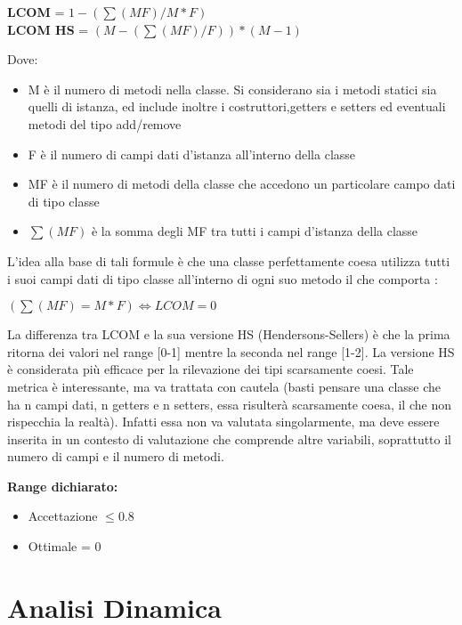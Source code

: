 \begin{center}
\textbf{LCOM} =  $1-(\sum(MF)/M \ast F) $  \\
\textbf{LCOM HS} = $(M-(\sum(MF)/F))\ast(M-1)$
\end{center}

Dove:
\begin{itemize}
\item M è il numero di metodi nella classe. Si considerano sia i metodi statici sia quelli di istanza, ed include inoltre i costruttori,getters e setters ed eventuali metodi del tipo add/remove
\item F è il numero di campi dati d'istanza all'interno della classe 
\item MF è il numero di metodi della classe che accedono un particolare campo dati di tipo classe
\item $\sum(MF)$ è la somma degli MF tra tutti i campi d'istanza della classe
\end{itemize}

L'idea alla base di tali formule è che una classe perfettamente coesa utilizza tutti i
suoi campi dati di tipo classe all'interno di ogni suo metodo il che comporta :

\begin{center}
 $(\sum(MF) = M \ast F) \Leftrightarrow LCOM = 0 $
\end{center}

La differenza tra LCOM e la sua versione HS (Hendersons-Sellers) è che la prima
ritorna dei valori nel range [0-1] mentre la seconda nel range [1-2]. La versione HS è
considerata più efficace per la rilevazione dei tipi scarsamente coesi.
Tale metrica è interessante, ma va trattata con cautela (basti pensare una classe
che ha n campi dati, n getters e n setters, essa risulterà scarsamente coesa, il che
non rispecchia la realtà). Infatti essa non va valutata singolarmente, ma deve essere
inserita in un contesto di valutazione che comprende altre variabili, soprattutto il
numero di campi e il numero di metodi. 

\textbf{Range dichiarato:}
\begin{itemize}
\item Accettazione $\leq 0.8$
\item Ottimale = 0
\end{itemize}

\newpage
\section{Analisi Dinamica}

